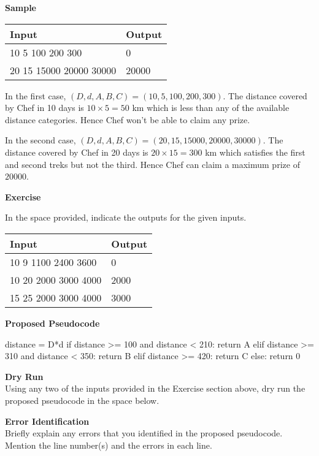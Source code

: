 \documentclass[a4paper]{exam}
\newcommand\heading[1]{\textbf{#1}}
\begin{document}
\begin{questions}
    \heading{Sample}

    \begin{tabularx}{\textwidth}{|X|X|}
        \rowcolor{gray!50}
        \hline
        Input      & Output \\ \hline\hline
        10 5 100 200 300  & 0      \\\hline
        20 15 15000 20000 30000 & 20000      \\\hline
    \end{tabularx}

    In the first case, $(D,d,A,B,C)=(10,5,100,200,300)$. The distance covered by Chef in 10 days is $10\times5=50$ km which is less than any of the available distance categories. Hence Chef won't be able to claim any prize.

    In the second case, $(D,d,A,B,C)=(20,15,15000,20000,30000)$. The distance covered by Chef in 20 days is $20\times15=300$ km which satisfies the first and second treks but not the third. Hence Chef can claim a maximum prize of $20000$.

    \heading{Exercise}

    In the space provided, indicate the outputs for the given inputs.

    \begin{tabularx}{\textwidth}{|X|X|}
        \rowcolor{gray!50}
        \hline
        Input      & Output \\ \hline\hline
        10 9 1100 2400 3600 & 0      \\\hline
        10 20 2000 3000 4000 & 2000      \\\hline
        15 25 2000 3000 4000 & 3000      \\\hline
    \end{tabularx}

    \heading{Proposed Pseudocode}
    \begin{python}
distance = D*d
if distance >= 100 and distance < 210:
    return A
elif distance >= 310 and distance < 350:
    return B
elif distance >= 420:
    return C
else:
    return 0
\end{python}
    
    \heading{Dry Run}\\
    Using any two of the inputs provided in the Exercise section above, dry run the proposed pseudocode in the space below.
    \vspace*{100pt}

    \heading{Error Identification}\\
    Briefly explain any errors that you identified in the proposed pseudocode. Mention the line number(s) and the errors in each line.


\end{questions}
\end{document}

